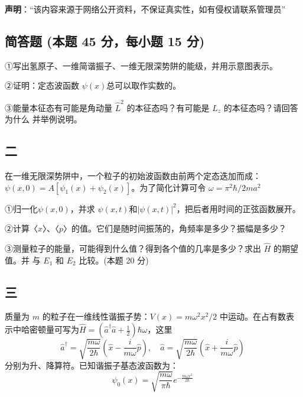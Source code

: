 
\textbf{声明}：“该内容来源于网络公开资料，不保证真实性，如有侵权请联系管理员”

\subsection{简答题 (本题 45 分，每小题 15 分)}
①写出氢原子、一维简谐振子、一维无限深势阱的能级，并用示意图表示。

②证明：定态波函数 $\psi(x)$总可以取作实数的。

③能量本征态有可能是角动量 $\hat{L}^2$ 的本征态吗？有可能是 $\hat{L}_z$ 的本征态吗？请回答为什么
并举例说明。

\subsection{二}
在一维无限深势阱中，一个粒子的初始波函数由前两个定态迭加而成：$\psi(x,0)=A[\psi_1 (x)
+\psi_2 (x)]$。为了简化计算可令 $\omega=\pi^2\hbar/2ma^2$

①归一化$\psi(x,0)$，并求 $\psi(x,t)$和$|\psi(x,t)|^2$，把后者用时间的正弦函数展开。

②计算〈$x$〉、〈$p$〉的值。它们是随时间振荡的，角频率是多少？振幅是多少？

③测量粒子的能量，可能得到什么值？得到各个值的几率是多少？求出 $\hat{H}$ 的期望值。并
与 $E_1$ 和 $E_2$ 比较。(本题 20 分)

\subsection{三}
质量为 $m$ 的粒子在一维线性谐振子势：$V(x)=m\omega^2x^2/2$ 中运动。在占有数表示中哈密顿量可写为$\hat{H} = \left(\hat{a}^\dagger \hat{a} + \frac{1}{2}\right)\hbar\omega$，这里 
$$\hat{a}^\dagger = \sqrt{\frac{m\omega}{2\hbar}} \left( \hat{x} - \frac{i}{m\omega} \hat{p} \right), \quad \hat{a} = \sqrt{\frac{m\omega}{2\hbar}} \left( \hat{x} + \frac{i}{m\omega} \hat{p} \right)~$$分别为升、降算符。已知谐振子基态波函数为：
$$\psi_0(x) = \sqrt{\frac{m\omega}{\pi \hbar}} e^{-\frac{m\omega x^2}{2 \hbar}}~$$
